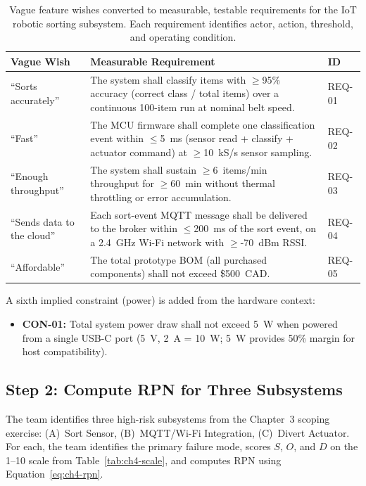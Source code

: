 \begin{table}[htbp]
  \centering
  \caption{Vague feature wishes converted to measurable, testable requirements for the IoT robotic sorting subsystem.
           Each requirement identifies actor, action, threshold, and operating condition.}
  \label{tab:ch4-requirements}
  \begin{tabular}{@{}p{3.2cm}p{7.5cm}l@{}}
    \toprule
    Vague Wish & Measurable Requirement & ID \\
    \midrule
    ``Sorts accurately'' &
      The system shall classify items with $\geq$95\% accuracy (correct class / total items) over a continuous 100-item run at nominal belt speed. &
      REQ-01 \\[4pt]
    ``Fast'' &
      The MCU firmware shall complete one classification event within $\leq$5~ms (sensor read + classify + actuator command) at $\geq$10~kS/s sensor sampling. &
      REQ-02 \\[4pt]
    ``Enough throughput'' &
      The system shall sustain $\geq$6~items/min throughput for $\geq$60~min without thermal throttling or error accumulation. &
      REQ-03 \\[4pt]
    ``Sends data to the cloud'' &
      Each sort-event MQTT message shall be delivered to the broker within $\leq$200~ms of the sort event, on a 2.4~GHz Wi-Fi network with $\geq$-70~dBm RSSI. &
      REQ-04 \\[4pt]
    ``Affordable'' &
      The total prototype BOM (all purchased components) shall not exceed \$500~CAD. &
      REQ-05 \\
    \bottomrule
  \end{tabular}
\end{table}

A sixth implied constraint (power) is added from the hardware context:

\begin{itemize}
  \item[] \textbf{CON-01:} Total system power draw shall not exceed 5~W when powered from a single USB-C port (5~V, 2~A = 10~W; 5~W provides 50\% margin for host compatibility).
\end{itemize}

\subsection{Step 2: Compute RPN for Three Subsystems}
\label{subsec:ch4-step2}

The team identifies three high-risk subsystems from the Chapter~3 scoping exercise: (A)~Sort Sensor, (B)~MQTT/Wi-Fi Integration, (C)~Divert Actuator.
For each, the team identifies the primary failure mode, scores $S$, $O$, and $D$ on the 1–10 scale from Table~\ref{tab:ch4-scale}, and computes RPN using Equation~\eqref{eq:ch4-rpn}.

